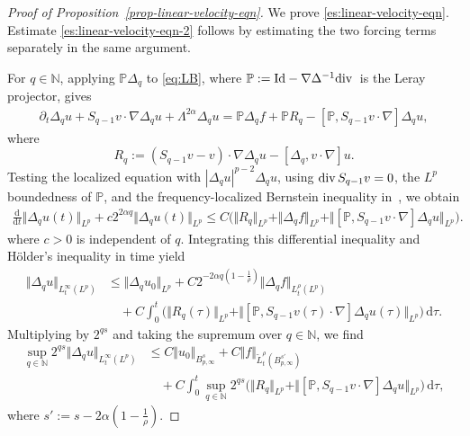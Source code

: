 \documentclass[reqno,11pt,a4paper]{amsart}
\newcommand{\dd}{\mathrm{d}}
\renewcommand{\div}{{\rm div\,}}
\begin{document}
\begin{proof}[Proof of Proposition~\ref{prop-linear-velocity-eqn}]
We prove \eqref{es:linear-velocity-eqn}.
Estimate \eqref{es:linear-velocity-eqn-2}
follows by estimating the two forcing terms separately
in the same argument.

For $q\in\mathbb N$, applying $\mathbb P\Delta_q$
to \eqref{eq:LB}, where
$\mathbb P:=\mathrm{Id}-\nabla\Delta^{-1}\div$
is the Leray projector, gives
\begin{align*}
  \partial_t\Delta_q u
  +S_{q-1}v\cdot\nabla\Delta_q u
  +\Lambda^{2\alpha}\Delta_q u
  =
  \mathbb P\Delta_q f+\mathbb P R_q
  -[\mathbb P,S_{q-1}v\cdot\nabla]\Delta_q u,
\end{align*}
where
\[
  R_q:=(S_{q-1}v-v)\cdot\nabla\Delta_q u
       -[\Delta_q,v\cdot\nabla]u.
\]
Testing the localized equation with $|\Delta_q u|^{p-2}\Delta_q u$,
using $\div S_{q-1}v=0$, the $L^p$ boundedness of $\mathbb P$, 
and the frequency-localized Bernstein inequality
in~\cite{CMZ07}, we obtain
\begin{align*}
  \frac{\dd}{\dd t}\Vert \Delta_q u(t)\Vert _{L^p}
  +c2^{2\alpha q}\Vert \Delta_q u(t)\Vert _{L^p}
  \leq
  C\Big(
    \Vert R_q\Vert _{L^p}
    +\Vert \Delta_q f\Vert _{L^p}
    +\Vert [\mathbb P,S_{q-1}v\cdot\nabla]
      \Delta_q u\Vert _{L^p}
  \Big).
\end{align*}
where $c>0$ is independent of $q$.
Integrating this differential inequality and H\"older's inequality in time yield 
\begin{align*}
  \Vert \Delta_q u\Vert _{L^\infty_t(L^p)}
  &\leq
  \Vert \Delta_q u_0\Vert _{L^p}
  +C2^{-2\alpha q(1-\frac1\rho)}
    \Vert \Delta_q f\Vert _{L^\rho_t(L^p)}
  \\
  &\quad+
  C\int_0^t
  \Big(
    \Vert R_q(\tau)\Vert _{L^p}
    +\Vert [\mathbb P,S_{q-1}v(\tau)\cdot\nabla]
      \Delta_q u(\tau)\Vert _{L^p}
  \Big)\,\dd\tau.
\end{align*}
Multiplying by $2^{qs}$ and taking the supremum over
$q\in\mathbb N$, we find
\begin{equation}\label{rrr}
\begin{aligned}
  \sup_{q\in\mathbb N}
  2^{qs}\Vert \Delta_q u\Vert _{L^\infty_t(L^p)}
  &\leq
  C\Vert u_0\Vert _{B^s_{p,\infty}}
  +C\Vert f\Vert _{\widetilde L^\rho_t(B^{s'}_{p,\infty})}
  \\
  &\quad+
  C\int_0^t
  \sup_{q\in\mathbb N}2^{qs}
  \Big(
    \Vert R_q\Vert _{L^p}
    +\Vert [\mathbb P,S_{q-1}v\cdot\nabla]
      \Delta_q u\Vert _{L^p}
  \Big)\,\dd\tau,
\end{aligned}
\end{equation}
where $s':=s-2\alpha(1-\frac1\rho)$.


\end{proof}
\end{document}
